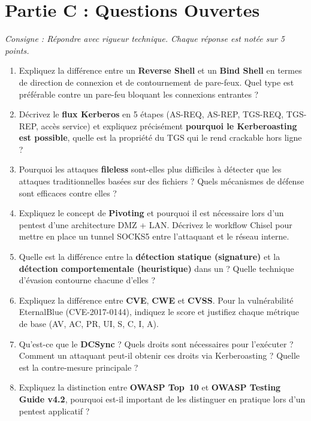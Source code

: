 \section{Partie C : Questions Ouvertes}
\label{sec:questions_ouvertes}

\textit{Consigne : Répondre avec rigueur technique. Chaque réponse est notée sur 5 points.}

\begin{enumerate}
    \item Expliquez la différence entre un \textbf{Reverse Shell} et un \textbf{Bind Shell}
          en termes de direction de connexion et de contournement de pare-feux.
          Quel type est préférable contre un pare-feu bloquant les connexions entrantes ?

    \item Décrivez le \textbf{flux Kerberos} en 5 étapes (AS-REQ, AS-REP, TGS-REQ,
          TGS-REP, accès service) et expliquez précisément \textbf{pourquoi le
          Kerberoasting est possible}, quelle est la propriété du TGS qui le
          rend crackable hors ligne ?

    \item Pourquoi les attaques \textbf{fileless} sont-elles plus difficiles à
          détecter que les attaques traditionnelles basées sur des fichiers ?
          Quels mécanismes de défense sont efficaces contre elles ?

    \item Expliquez le concept de \textbf{Pivoting} et pourquoi il est nécessaire
          lors d'un pentest d'une architecture DMZ + LAN. Décrivez le workflow
          Chisel pour mettre en place un tunnel SOCKS5 entre l'attaquant et le
          réseau interne.

    \item Quelle est la différence entre la \textbf{détection statique (signature)}
          et la \textbf{détection comportementale (heuristique)} dans un
           ? Quelle technique d'évasion contourne chacune d'elles ?

    \item Expliquez la différence entre \textbf{CVE}, \textbf{CWE} et
          \textbf{CVSS}. Pour la vulnérabilité EternalBlue (CVE-2017-0144),
          indiquez le score  et justifiez chaque métrique
          de base (AV, AC, PR, UI, S, C, I, A).

    \item Qu'est-ce que le \textbf{DCSync} ? Quels droits sont nécessaires pour
          l'exécuter ? Comment un attaquant peut-il obtenir ces droits via
          Kerberoasting ? Quelle est la contre-mesure principale ?

    \item Expliquez la distinction entre \textbf{OWASP Top~10} et \textbf{OWASP
          Testing Guide v4.2}, pourquoi est-il important de les distinguer en
          pratique lors d'un pentest applicatif ?
\end{enumerate}

